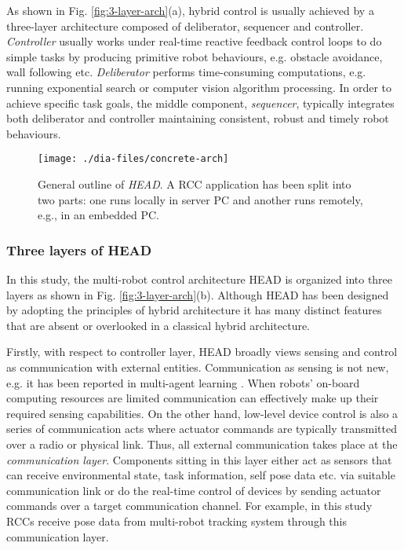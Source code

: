 As shown in Fig. \ref{fig:3-layer-arch}(a), hybrid control is usually achieved by a three-layer architecture composed of deliberator, sequencer and controller. {\em Controller} usually works under real-time reactive feedback control loops to do simple tasks by producing primitive robot behaviours, e.g. obstacle avoidance, wall following etc. {\em Deliberator} performs time-consuming computations, e.g. running exponential search or computer vision algorithm processing. In order to achieve specific task goals, the middle component, {\em sequencer}, typically integrates both deliberator and controller maintaining consistent, robust and timely robot behaviours.
\begin{sidewaysfigure}
\begin{center}
\texttt{[image: ./dia-files/concrete-arch]} 
\caption{General outline of {\em HEAD}. A RCC application has been split into two parts: one runs locally in server PC and another runs remotely, e.g., in an embedded PC.} 
\label{fig:concrete-arch}
\end{center}
\end{sidewaysfigure}
\subsubsection*{Three layers of HEAD}
In this study, the multi-robot control architecture HEAD is organized into three layers as shown in Fig. \ref{fig:3-layer-arch}(b). Although HEAD has been designed by adopting the principles of hybrid architecture it has many distinct features that are absent or overlooked in a classical hybrid architecture. 

Firstly, with respect to controller layer, HEAD broadly views sensing and control as communication with external entities. Communication as sensing is not new, e.g. it has been reported in multi-agent learning \cite{Mataric1998}. When robots' on-board computing resources are limited communication can effectively make up their required sensing capabilities. On the other hand, low-level device control is also a series of communication acts where actuator commands are typically transmitted over a radio or physical link. Thus, all external communication takes place at the {\em communication layer}. Components sitting in this layer either act as sensors that can receive environmental state, task information, self pose data etc. via suitable communication link or do the real-time control of devices by sending actuator commands over a target communication channel. For example, in this study RCCs receive pose data from multi-robot tracking system through this communication layer.  %

